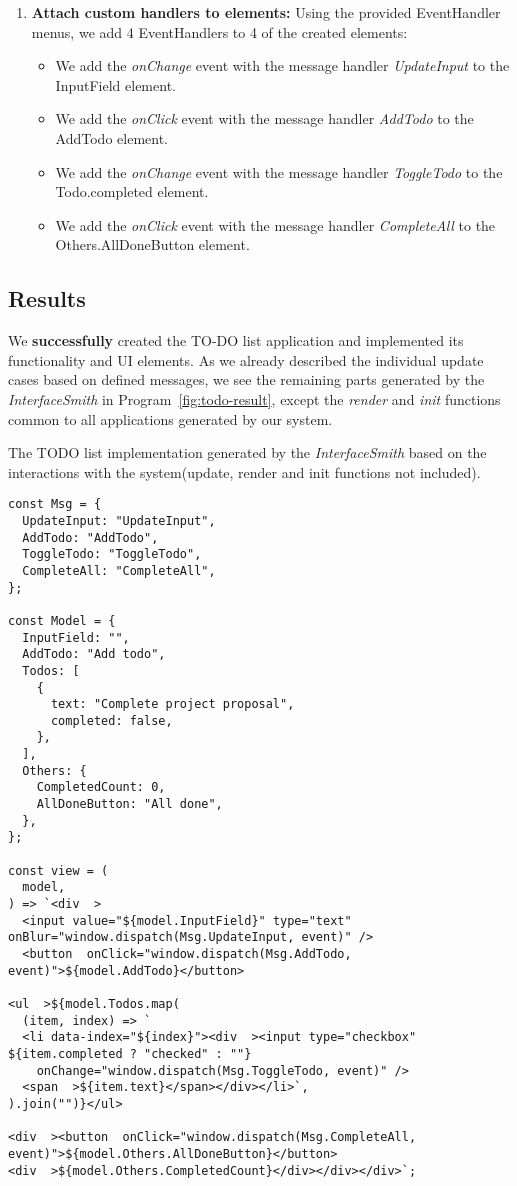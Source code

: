 \begin{enumerate}
\begin{itemize}
\end{itemize}

\item \textbf{Attach custom handlers to elements:} Using the provided EventHandler menus, we add 4 EventHandlers to 4 of the created elements:
\begin{itemize}
	\item We add the \emph{onChange} event with the message handler \emph{UpdateInput} to the InputField element.
	\item We add the \emph{onClick} event with the message handler \emph{AddTodo} to the AddTodo element.
	\item We add the \emph{onChange} event with the message handler \emph{ToggleTodo} to the Todo.completed element.
	\item We add the \emph{onClick} event with the message handler \emph{CompleteAll} to the Others.AllDoneButton element.
\end{itemize}
\end{enumerate}
\medskip
\subsection{Results}
We \textbf{successfully} created the TO-DO list application and implemented its functionality and UI elements.
As we already described the individual update cases based on defined messages, we see the remaining parts generated by the \emph{InterfaceSmith} in Program~\ref{fig:todo-result},
except the \emph{render} and \emph{init} functions common to all applications generated by our system.

\begin{listing}[p]
	\caption {The TODO list implementation generated by the \emph{InterfaceSmith} based on the interactions with the system(update, render and init functions not included).}
	\label{fig:todo-result}
	\begin{lstlisting}
const Msg = {
  UpdateInput: "UpdateInput",
  AddTodo: "AddTodo",
  ToggleTodo: "ToggleTodo",
  CompleteAll: "CompleteAll",
};

const Model = {
  InputField: "",
  AddTodo: "Add todo",
  Todos: [
    {
      text: "Complete project proposal",
      completed: false,
    },
  ],
  Others: {
    CompletedCount: 0,
    AllDoneButton: "All done",
  },
};

const view = (
  model,
) => `<div  >
  <input value="${model.InputField}" type="text" onBlur="window.dispatch(Msg.UpdateInput, event)" />
  <button  onClick="window.dispatch(Msg.AddTodo, event)">${model.AddTodo}</button>

<ul  >${model.Todos.map(
  (item, index) => `
  <li data-index="${index}"><div  ><input type="checkbox" ${item.completed ? "checked" : ""} 
    onChange="window.dispatch(Msg.ToggleTodo, event)" />
  <span  >${item.text}</span></div></li>`,
).join("")}</ul>

<div  ><button  onClick="window.dispatch(Msg.CompleteAll, event)">${model.Others.AllDoneButton}</button>
<div  >${model.Others.CompletedCount}</div></div></div>`;
\end{lstlisting}
\end{listing}

